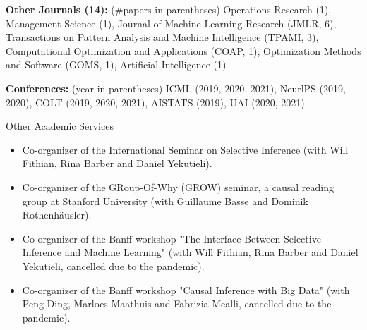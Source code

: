 \documentclass{article}
\begin{document}
\vspace{2mm}
\noindent \textbf{Other Journals (14): }(\#papers in parentheses) Operations Research (1), Management Science (1), Journal of Machine Learning Research (JMLR, 6), Transactions on Pattern Analysis and Machine Intelligence (TPAMI, 3), Computational Optimization and Applications (COAP, 1), Optimization Methods and Software (GOMS, 1), Artificial Intelligence (1)

\vspace{2mm}
\noindent \textbf{Conferences: }(year in parentheses) ICML (2019, 2020, 2021), NeurlPS (2019, 2020), COLT (2019, 2020, 2021), AISTATS (2019), UAI (2020, 2021)

\vspace{5mm}
\begin{large}
\noindent Other Academic Services
\end{large}

\begin{itemize}
\item Co-organizer of the International Seminar on Selective Inference (with Will Fithian, Rina Barber and Daniel Yekutieli).
\item Co-organizer of the GRoup-Of-Why (GROW) seminar, a causal reading group at Stanford University (with Guillaume Basse and Dominik Rothenhäusler).
\item Co-organizer of the Banff workshop "The Interface Between Selective Inference and Machine Learning" (with Will Fithian, Rina Barber and Daniel Yekutieli, cancelled due to the pandemic).
\item Co-organizer of the Banff workshop "Causal Inference with Big Data" (with Peng Ding, Marloes Maathuis and Fabrizia Mealli, cancelled due to the pandemic).
\end{itemize}
\end{document}
